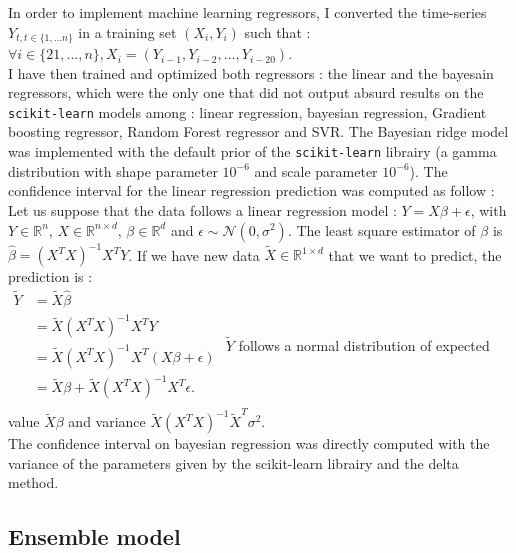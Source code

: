In order to implement machine learning regressors, I converted the time-series $Y_{t,  t \in \{1, \hdots n\}}$ in a training set $(X_i, Y_i)$ such that : \\
$\forall i \in \{21, ..., n\}, X_i = (Y_{i-1}, Y_{i-2}, ..., Y_{i-20})$.\\

I have then trained and optimized both regressors : the linear and the bayesain regressors, which were the only one that did not output absurd results on the \texttt{scikit-learn} models among : linear regression, bayesian regression, Gradient boosting regressor, Random Forest regressor and SVR. 
The Bayesian ridge model was implemented with the default prior of the \texttt{scikit-learn} librairy (a gamma distribution with shape parameter $10^{-6}$ and scale parameter $10^{-6}$).
The confidence interval for the linear regression prediction was computed as follow : \\
Let us suppose that the data follows a linear regression model : $Y = X\beta + \epsilon$, with $Y \in \mathbb{R}^n$, $X \in \mathbb{R}^{n \times d}$, $\beta \in \mathbb{R}^d$ and $\epsilon \sim \mathcal{N}(0, \sigma^2)$.
The least square estimator of $\beta$ is $\hat{\beta} = (X^T X)^{-1} X^T Y$.
If we have new data $\tilde{X} \in \mathbb{R}^{1 \times d}$ that we want to predict, the prediction is  : \\

$
\begin{aligned}
    \tilde{Y} & = \tilde{X} \hat{\beta} \\
    &   = \tilde{X} (X^T X)^{-1} X^T Y \\
    &  = \tilde{X} (X^T X)^{-1} X^T (X\beta + \epsilon) \\
    &  = \tilde{X} \beta + \tilde{X} (X^T X)^{-1} X^T \epsilon.\\
\end{aligned}
$
\newline
$\tilde{Y}$ follows a normal distribution of expected value $\tilde{X} \beta$ and variance $\tilde{X} (X^T X)^{-1} \tilde{X}^T \sigma ^2$.\\
The confidence interval on bayesian regression was directly computed with the variance of the parameters given by the scikit-learn librairy and the delta method. 

\subsection{Ensemble model}

